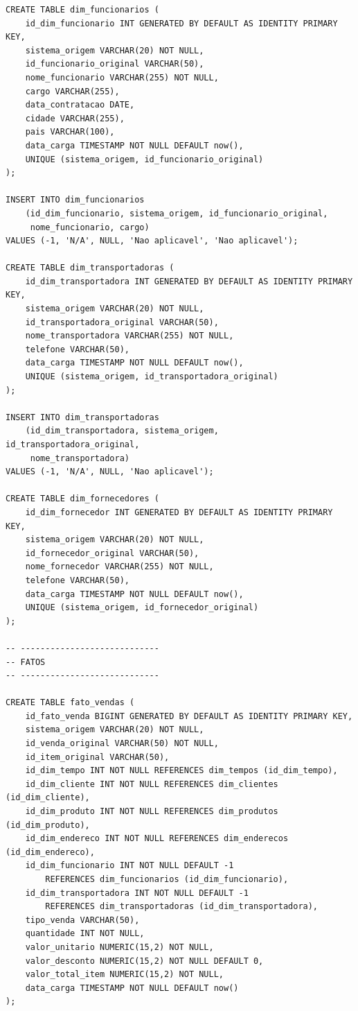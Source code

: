 {\begin{verbatim}
CREATE TABLE dim_funcionarios (
    id_dim_funcionario INT GENERATED BY DEFAULT AS IDENTITY PRIMARY KEY,
    sistema_origem VARCHAR(20) NOT NULL,
    id_funcionario_original VARCHAR(50),
    nome_funcionario VARCHAR(255) NOT NULL,
    cargo VARCHAR(255),
    data_contratacao DATE,
    cidade VARCHAR(255),
    pais VARCHAR(100),
    data_carga TIMESTAMP NOT NULL DEFAULT now(),
    UNIQUE (sistema_origem, id_funcionario_original)
);

INSERT INTO dim_funcionarios
    (id_dim_funcionario, sistema_origem, id_funcionario_original,
     nome_funcionario, cargo)
VALUES (-1, 'N/A', NULL, 'Nao aplicavel', 'Nao aplicavel');

CREATE TABLE dim_transportadoras (
    id_dim_transportadora INT GENERATED BY DEFAULT AS IDENTITY PRIMARY KEY,
    sistema_origem VARCHAR(20) NOT NULL,
    id_transportadora_original VARCHAR(50),
    nome_transportadora VARCHAR(255) NOT NULL,
    telefone VARCHAR(50),
    data_carga TIMESTAMP NOT NULL DEFAULT now(),
    UNIQUE (sistema_origem, id_transportadora_original)
);

INSERT INTO dim_transportadoras
    (id_dim_transportadora, sistema_origem, id_transportadora_original,
     nome_transportadora)
VALUES (-1, 'N/A', NULL, 'Nao aplicavel');

CREATE TABLE dim_fornecedores (
    id_dim_fornecedor INT GENERATED BY DEFAULT AS IDENTITY PRIMARY KEY,
    sistema_origem VARCHAR(20) NOT NULL,
    id_fornecedor_original VARCHAR(50),
    nome_fornecedor VARCHAR(255) NOT NULL,
    telefone VARCHAR(50),
    data_carga TIMESTAMP NOT NULL DEFAULT now(),
    UNIQUE (sistema_origem, id_fornecedor_original)
);

-- ----------------------------
-- FATOS
-- ----------------------------

CREATE TABLE fato_vendas (
    id_fato_venda BIGINT GENERATED BY DEFAULT AS IDENTITY PRIMARY KEY,
    sistema_origem VARCHAR(20) NOT NULL,
    id_venda_original VARCHAR(50) NOT NULL,
    id_item_original VARCHAR(50),
    id_dim_tempo INT NOT NULL REFERENCES dim_tempos (id_dim_tempo),
    id_dim_cliente INT NOT NULL REFERENCES dim_clientes (id_dim_cliente),
    id_dim_produto INT NOT NULL REFERENCES dim_produtos (id_dim_produto),
    id_dim_endereco INT NOT NULL REFERENCES dim_enderecos (id_dim_endereco),
    id_dim_funcionario INT NOT NULL DEFAULT -1
        REFERENCES dim_funcionarios (id_dim_funcionario),
    id_dim_transportadora INT NOT NULL DEFAULT -1
        REFERENCES dim_transportadoras (id_dim_transportadora),
    tipo_venda VARCHAR(50),
    quantidade INT NOT NULL,
    valor_unitario NUMERIC(15,2) NOT NULL,
    valor_desconto NUMERIC(15,2) NOT NULL DEFAULT 0,
    valor_total_item NUMERIC(15,2) NOT NULL,
    data_carga TIMESTAMP NOT NULL DEFAULT now()
);


\end{verbatim}}
